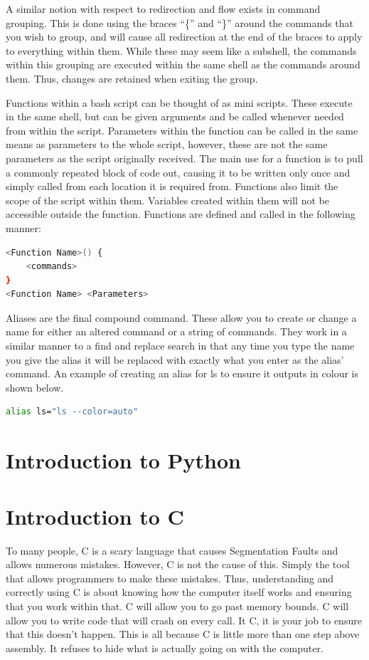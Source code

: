 \documentclass[a4paper,11pt]{report}
\begin{document}
			A similar notion with respect to redirection and flow exists in command grouping. 
			This is done using the braces ``\{'' and ``\}'' around the commands that you wish to group, and will cause all redirection at the end of the braces to apply to everything within them. 
			While these may seem like a subshell, the commands within this grouping are executed within the same shell as the commands around them. 
			Thus, changes are retained when exiting the group. 

			Functions within a bash script can be thought of as mini scripts. 
			These execute in the same shell, but can be given arguments and be called whenever needed from within the script. 
			Parameters within the function can be called in the same means as parameters to the whole script, however, these are not the same parameters as the script originally received. 
			The main use for a function is to pull a commonly repeated block of code out, causing it to be written only once and simply called from each location it is required from. 
			Functions also limit the scope of the script within them. 
			Variables created within them will not be accessible outside the function. 
			Functions are defined and called in the following manner:
			\begin{lstlisting}[language=bash,numbers=none]
<Function Name>() {
	<commands>
}
<Function Name> <Parameters>
			\end{lstlisting}
		
			Aliases are the final compound command. 
			These allow you to create or change a name for either an altered command or a string of commands. 
			They work in a similar manner to a find and replace search in that any time you type the name you give the alias it will be replaced with exactly what you enter as the alias' command. 
			An example of creating an alias for ls to ensure it outputs in colour is shown below. 
			\begin{lstlisting}[language=bash,numbers=none]
alias ls="ls --color=auto"
			\end{lstlisting}
	\section{Introduction to Python}
	\section{Introduction to C}
		To many people, C is a scary language that causes Segmentation Faults and allows numerous mistakes. 
		However, C is not the cause of this. Simply the tool that allows programmers to make these mistakes. 
		Thus, understanding and correctly using C is about knowing how the computer itself works and ensuring that you work within that. 
		C will allow you to go past memory bounds. 
		C will allow you to write code that will crash on every call. 
		It C, it is your job to ensure that this doesn't happen. 
		This is all because C is little more than one step above assembly. 
		It refuses to hide what is actually going on with the computer. 
\end{document}
